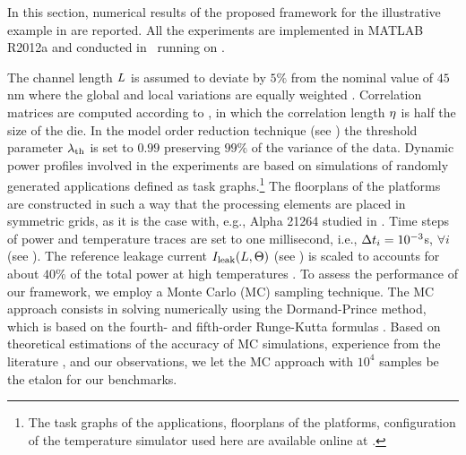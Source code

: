 In this section, numerical results of the proposed framework for the illustrative example in  are reported. All the experiments are implemented in MATLAB R2012a \cite{matlab} and conducted in \hostOS\ running on \hostHardware.

The channel length $L$ is assumed to deviate by $5\%$ from the nominal value of $45$ nm where the global and local variations are equally weighted \cite{juan2011, juan2012}. Correlation matrices are computed according to , in which the correlation length $\eta$ is half the size of the die. In the model order reduction technique (see ) the threshold parameter $\lambda_\text{th}$ is set to $0.99$ preserving $99\%$ of the variance of the data. Dynamic power profiles involved in the experiments are based on simulations of randomly generated applications defined as task graphs.\footnote{The task graphs of the applications, floorplans of the platforms, configuration of the temperature simulator used here are available online at \cite{sources}.} The floorplans of the platforms are constructed in such a way that the processing elements are placed in symmetric grids, as it is the case with, e.g., Alpha 21264 studied in \cite{juan2011}. Time steps of power and temperature traces are set to one millisecond, i.e., $\Delta t_i = 10^{-3}$s, $\forall i$ (see ). The reference leakage current $I_{\text{leak}}(L, \Theta)$ (see ) is scaled to accounts for about $40\%$ of the total power at high temperatures \cite{liu2007}. To assess the performance of our framework, we employ a Monte Carlo (MC) sampling technique. The MC approach consists in solving  numerically using the Dormand-Prince method, which is based on the fourth- and fifth-order Runge-Kutta formulas \cite{press2007}. Based on theoretical estimations \cite{diaz-emparanza2002} of the accuracy of MC simulations, experience from the literature \cite{xiu2010, eldred2009, maitre2010, shen2009}, and our observations, we let the MC approach with $10^4$ samples be the etalon for our benchmarks.

